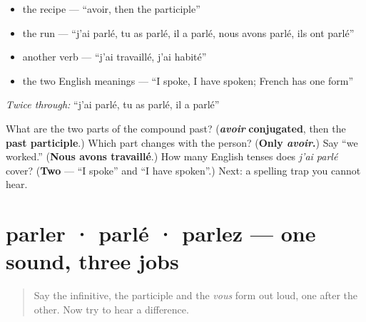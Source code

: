 \begin{itemize}
\raggedright
  \item the recipe — \textquotedblleft{}avoir, then the participle\textquotedblright{}
  \item the run — \textquotedblleft{}j'ai parlé, tu as parlé, il a parlé, nous avons parlé, ils ont parlé\textquotedblright{}
  \item another verb — \textquotedblleft{}j'ai travaillé, j'ai habité\textquotedblright{}
  \item the two English meanings — \textquotedblleft{}I spoke, I have spoken; French has one form\textquotedblright{}
\end{itemize}

\emph{Twice through:} \textquotedblleft{}j'ai parlé, tu as parlé, il a parlé\textquotedblright{}

\begin{tcolorbox}[breakable,colback=teal!4,colframe=teal!35!black,title={Before you move on}]
What are the two parts of the compound past? (\emph{\textbf{avoir}} \textbf{conjugated}, then the \textbf{past participle}.) Which part changes with the person? (\textbf{Only \emph{avoir}.}) Say \textquotedblleft{}we worked.\textquotedblright{} (\textbf{Nous avons travaillé}.) How many English tenses does \emph{j'ai parlé} cover? (\textbf{Two} — \textquotedblleft{}I spoke\textquotedblright{} and \textquotedblleft{}I have spoken\textquotedblright{}.) Next: a spelling trap you cannot hear.
\end{tcolorbox}
\section[parler · parlé · parlez]{parler · parlé · parlez — one sound, three jobs}

\label{lesson:FR-C15-parler-parle-parlez}



\begin{quote}
Say the infinitive, the participle and the \emph{vous} form out loud, one after the other. Now try to hear a difference.
\end{quote}


